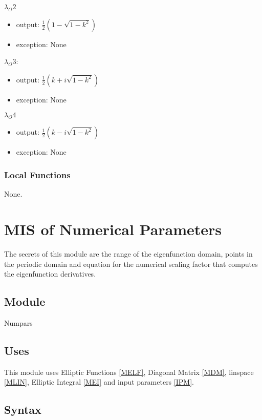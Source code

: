 \documentclass[12pt, titlepage]{article}
\begin{document}
\noindent $\lambda_O2$
\begin{itemize} 
	\item output: $\frac{1}{2} (1-\sqrt{1-k^{2}})$ 
	\item exception: None
\end{itemize} 

$\lambda_O3$:
\begin{itemize}
	\item output: $\frac{1}{2} (k+i\sqrt{1-k^{2}})$ 
	\item exception: None
\end{itemize}


\noindent $\lambda_O4$
\begin{itemize} 
	\item output: $\frac{1}{2} (k-i\sqrt{1-k^{2}})$ 
	\item exception: None
\end{itemize}

\subsubsection{Local Functions} 

None. 

\newpage

\section{MIS of Numerical Parameters} \label{MNP}

The secrets of this module are the range of the eigenfunction domain, points in 
the 
periodic domain and equation for the numerical scaling factor that computes 
the 
eigenfunction derivatives. 

\subsection{Module}

Numpars

\subsection{Uses}

This module uses Elliptic Functions \ref{MELF}, Diagonal Matrix \ref{MDM}, 
linspace \ref{MLIN}, Elliptic 
Integral \ref{MEI} and input parameters \ref{IPM}. 

\subsection{Syntax}
\end{document}

